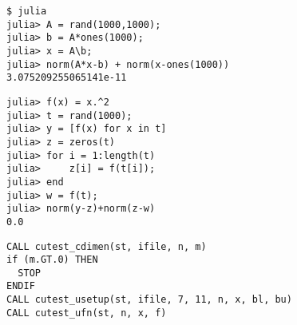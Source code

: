 

\begin{frame}[fragile]
\begin{lstlisting}
$ julia
julia> A = rand(1000,1000);
julia> b = A*ones(1000);
julia> x = A\b;
julia> norm(A*x-b) + norm(x-ones(1000))
3.075209255065141e-11
\end{lstlisting}
\end{frame}

\begin{frame}[fragile]
\begin{lstlisting}
julia> f(x) = x.^2
julia> t = rand(1000);
julia> y = [f(x) for x in t]
julia> z = zeros(t)
julia> for i = 1:length(t)
julia>     z[i] = f(t[i]);
julia> end
julia> w = f(t);
julia> norm(y-z)+norm(z-w)
0.0
\end{lstlisting}
\end{frame}


\begin{frame}[fragile]
\begin{lstlisting}
CALL cutest_cdimen(st, ifile, n, m)
if (m.GT.0) THEN
  STOP
ENDIF
CALL cutest_usetup(st, ifile, 7, 11, n, x, bl, bu)
CALL cutest_ufn(st, n, x, f)
\end{lstlisting}
\end{frame}

